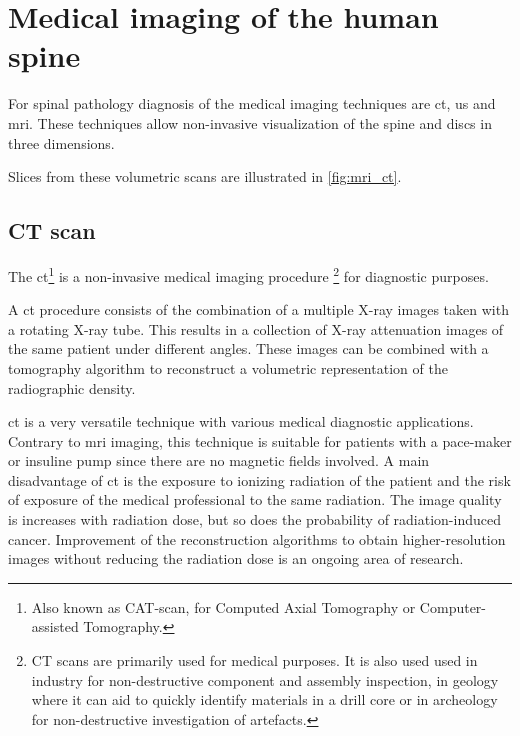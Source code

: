 \section{Medical imaging of the human spine\label{sec:medical_imaging}}


For spinal pathology diagnosis of the  medical imaging techniques are \acrfull{ct}, \acrfull{us} and \acrfull{mri}. 
These techniques allow non-invasive visualization of the spine and discs in three dimensions.

Slices from these volumetric scans are illustrated in \ref{fig:mri_ct}.

\subsection{CT scan}
The \acrfull{ct}\footnote{Also known as CAT-scan, for Computed Axial Tomography or Computer-assisted Tomography.} is a non-invasive medical imaging procedure
\footnote{CT scans are primarily used for medical purposes. 
It is also used used in industry for non-destructive component and assembly inspection, 
in geology where it can aid to quickly identify materials in a drill core or in archeology for non-destructive investigation of artefacts. } 
for diagnostic purposes. 

A \acrlong{ct} procedure consists of the combination of a multiple X-ray images taken with a rotating X-ray tube. 
This results in a collection of X-ray attenuation images of the same patient under different angles. 
These images can be combined with a tomography algorithm to reconstruct a volumetric representation of the radiographic density.


\acrshort{ct} is a very versatile technique with various medical diagnostic applications. 
Contrary to \acrfull{mri} imaging, this technique is suitable for patients with a pace-maker or insuline pump since there are no magnetic fields involved.
A main disadvantage of \acrshort{ct} is the exposure to ionizing radiation of the patient and the risk of exposure of the medical professional to the same radiation.
The image quality is increases with radiation dose, but so does the probability of radiation-induced cancer.
Improvement of the reconstruction algorithms to obtain higher-resolution images without reducing the radiation dose is an ongoing area of research. 

